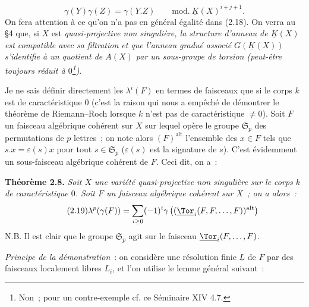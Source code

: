 \begin{equation}\tag{2.18}
 \gamma(Y)\gamma(Z)=\gamma(Y.Z)\qquad\mathrm{mod.}\ \underline K(X)^{i+j+1}.
\end{equation}
On
fera attention à ce qu'on n'a pas en général égalité dans (2.18). On verra au \S 4 que, si $X$ est \emph{quasi-projective non singulière, la structure d'anneau de $\underline K(X)$ est compatible avec sa filtration et que l'anneau gradué associé $G(\underline K(X))$ s'identifie à un quotient de $A(X)$ par un sous-groupe de torsion (peut-être toujours réduit à $0$\footnote{Non~; pour un contre-exemple cf. ce Séminaire XIV 4.7.})}.

Je ne sais définir directement les $\lambda^i(F)$ en termes de faisceaux que si le corps $k$ est de caractéristique $0$ (c'est la raison qui nous a empêché de démontrer le théorème de Riemann--Roch lorsque $k$ n'est pas de caractéristique $\neq0$). Soit $F$ un faisceau algébrique cohérent sur $X$ sur lequel opère le groupe $\mathfrak S_p$ des permutations de $p$ lettres~; on note alors $(F)^{\mathrm{alt}}$ l'ensemble des $x\in F$ tels que $s.x=\varepsilon(s)x$ pour tout $s\in\mathfrak S_p$ ($\varepsilon(s)$ est la signature de $s$). C'est évidemment un sous-faisceau algébrique cohérent de $F$. Ceci dit, on a~:

\textbf{Théorème 2.8.} \emph{Soit $X$ une variété quasi-projective non singulière sur le corps $k$ de caractéristique $0$. Soit $F$ un faisceau algébrique cohérent sur $X$~; on a alors~:}
\begin{equation}\tag{2.19}
 \lambda^p(\gamma(F))=\sum_{i\geq0}(-1)^i\gamma\left((\underline{\Tor}_i(F,F,\ldots,F))^{\mathrm{alt}}\right)
\end{equation}
N.B. Il est clair que le groupe $\mathfrak S_p$ agit sur le faisceau $\underline{\Tor}_i(F,\ldots,F)$.

\emph{Principe de la démonstration}~: on considère une résolution finie $\underline L$ de $F$ par des faisceaux localement libres $L_i$, et l'on utilise le lemme général suivant~:

